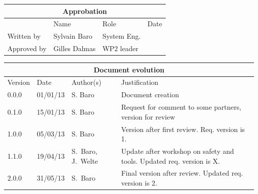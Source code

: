 \documentclass{template/openetcs_article}
\begin{document}
\begin{tabular}{|p{2.2cm}|p{4cm}|p{4cm}|p{2cm}|}
\hline
\multicolumn{4}{|c|}{Approbation} \\
\hline
  &  Name & Role & Date   \\
\hline  
Written by    &  Sylvain Baro & System Eng.  & \\
\hline
Approved by & Gilles Dalmas & WP2 leader & \\
\hline
\end{tabular}

\begin{tabular}{|p{2.2cm}|p{2cm}|p{3cm}|p{5cm}|}
\hline
\multicolumn{4}{|c|}{Document evolution} \\
\hline
Version &  Date & Author(s) & Justification  \\
\hline  
0.0.0 & 01/01/13 & S. Baro &  Document creation  \\
\hline  
0.1.0 & 15/01/13 & S. Baro &  Request for comment to some partners, version for review  \\
\hline  
1.0.0 & 05/03/13 & S. Baro &  Version after first review. Req. version is 1. \\
\hline
1.1.0 & 19/04/13 & S.~Baro, J.~Welte &  Update after workshop on safety and tools. Updated req. version is X.\\
\hline
2.0.0 & 31/05/13 & S.~Baro  &  Final version after review. Updated req. version is 2.\\
\hline
\end{tabular}

\newpage

\tableofcontents
\newpage







\newcommand{\docend}{{\begin{center}\large\textbf{<End of Document>}\end{center}}}
\newcommand{\tbd}{\colorbox{cyan}{\%\%To Be Defined\%\%}}
\newcommand{\tbc}{\colorbox{cyan}{\%\%To Be Confirmed\%\%}}
\newcommand{\todo}[1]{\colorbox{cyan}{\%\%{#1}\%\%}}
\newlength{\origindent}

\newenvironment{issue}{
	\begin{quote}
	\begin{itshape}Open Issue. 
}{
	\end{itshape}
	\end{quote}
}
\end{document}
